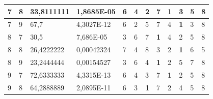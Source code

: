 \documentclass[conference]{IEEEtran}
\begin{document}
\begin{table}[]
\begin{tabular}{|llll|llllllll|}
		\multicolumn{1}{|l|}{7}   & \multicolumn{1}{l|}{8}         & \multicolumn{1}{l|}{33,8111111}    & 1,8685E-05 & \multicolumn{1}{l|}{6}   & \multicolumn{1}{l|}{4}          & \multicolumn{1}{l|}{2}          & \multicolumn{1}{l|}{7}          & \multicolumn{1}{l|}{\textbf{1}} & \multicolumn{1}{l|}{3}          & \multicolumn{1}{l|}{5}   & 8                      \\ \hline
		\multicolumn{1}{|l|}{7}   & \multicolumn{1}{l|}{9}         & \multicolumn{1}{l|}{67,7}          & 4,3027E-12 & \multicolumn{1}{l|}{6}   & \multicolumn{1}{l|}{2}          & \multicolumn{1}{l|}{5}          & \multicolumn{1}{l|}{7}          & \multicolumn{1}{l|}{4}          & \multicolumn{1}{l|}{\textbf{1}} & \multicolumn{1}{l|}{3}   & 8                      \\ \hline
		\multicolumn{1}{|l|}{8}   & \multicolumn{1}{l|}{7}         & \multicolumn{1}{l|}{30,5}          & 7,686E-05  & \multicolumn{1}{l|}{3}   & \multicolumn{1}{l|}{6}          & \multicolumn{1}{l|}{7}          & \multicolumn{1}{l|}{\textbf{1}} & \multicolumn{1}{l|}{4}          & \multicolumn{1}{l|}{2}          & \multicolumn{1}{l|}{5}   & 8                      \\ \hline
		\multicolumn{1}{|l|}{8}   & \multicolumn{1}{l|}{8}         & \multicolumn{1}{l|}{26,4222222}    & 0,00042324 & \multicolumn{1}{l|}{7}   & \multicolumn{1}{l|}{4}          & \multicolumn{1}{l|}{8}          & \multicolumn{1}{l|}{3}          & \multicolumn{1}{l|}{2}          & \multicolumn{1}{l|}{\textbf{1}} & \multicolumn{1}{l|}{6}   & 5                      \\ \hline
		\multicolumn{1}{|l|}{8}   & \multicolumn{1}{l|}{9}         & \multicolumn{1}{l|}{23,2444444}    & 0,00154527 & \multicolumn{1}{l|}{3}   & \multicolumn{1}{l|}{6}          & \multicolumn{1}{l|}{4}          & \multicolumn{1}{l|}{\textbf{1}} & \multicolumn{1}{l|}{2}          & \multicolumn{1}{l|}{5}          & \multicolumn{1}{l|}{7}   & 8                      \\ \hline
		\multicolumn{1}{|l|}{9}   & \multicolumn{1}{l|}{7}         & \multicolumn{1}{l|}{72,6333333}    & 4,3315E-13 & \multicolumn{1}{l|}{6}   & \multicolumn{1}{l|}{4}          & \multicolumn{1}{l|}{3}          & \multicolumn{1}{l|}{7}          & \multicolumn{1}{l|}{\textbf{1}} & \multicolumn{1}{l|}{2}          & \multicolumn{1}{l|}{5}   & 8                      \\ \hline
		\multicolumn{1}{|l|}{9}   & \multicolumn{1}{l|}{8}         & \multicolumn{1}{l|}{64,2888889}    & 2,0895E-11 & \multicolumn{1}{l|}{6}   & \multicolumn{1}{l|}{3}          & \multicolumn{1}{l|}{\textbf{1}} & \multicolumn{1}{l|}{7}          & \multicolumn{1}{l|}{2}          & \multicolumn{1}{l|}{4}          & \multicolumn{1}{l|}{5}   & 8                      \\ \hline

\end{tabular}
\end{table}
\end{document}
